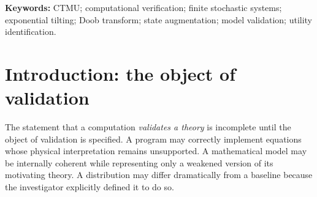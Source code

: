 \documentclass[11pt]{article}
\theoremstyle{remark}
\begin{document}
\begin{abstract}
A successful computation can verify a mathematical construction without validating the philosophical theory that motivated it. This paper examines that distinction through CTMU-F 0.2, a finite stochastic model inspired by Christopher Langan's Cognitive-Theoretic Model of the Universe. The model combines an evolving binary rule selector, a four-state data space, and an exponential weighting of complete histories by a chosen recurrence functional. Every one of its 512 supported six-transition histories is enumerated. A retrospective audit reproduces the original probabilities, passes 26 implementation and mathematical-property tests, corrects an inadequately controlled memory diagnostic, and constructs a forward-time Markov representation of the entire weighted ensemble. The representation requires bounded state augmentation and time-dependent transition coefficients, not access to a realized future. Additional analysis distinguishes altered initial preparation from altered conditional evolution, establishes the non-identifiability of an unrestricted utility, and characterizes dependence on the terminal horizon. These results verify a particular probability model and consequences of its definitions. They do not establish that the model satisfies CTMU's central claims, that its utility is intrinsic to reality, or that it predicts physical observations. The contribution is a reproducible example of how a metaphysically motivated construction can be made precise, compared with conventional mathematical representations, and assigned an evidential status proportional to what was demonstrated.
\end{abstract}

\textbf{Keywords:} CTMU; computational verification; finite stochastic systems; exponential tilting; Doob transform; state augmentation; model validation; utility identification.

\tableofcontents
\newpage

\section{Introduction: the object of validation}

The statement that a computation \emph{validates a theory} is incomplete until the object of validation is specified. A program may correctly implement equations whose physical interpretation remains unsupported. A mathematical model may be internally coherent while representing only a weakened version of its motivating theory. A distribution may differ dramatically from a baseline because the investigator explicitly defined it to do so.
\end{document}
